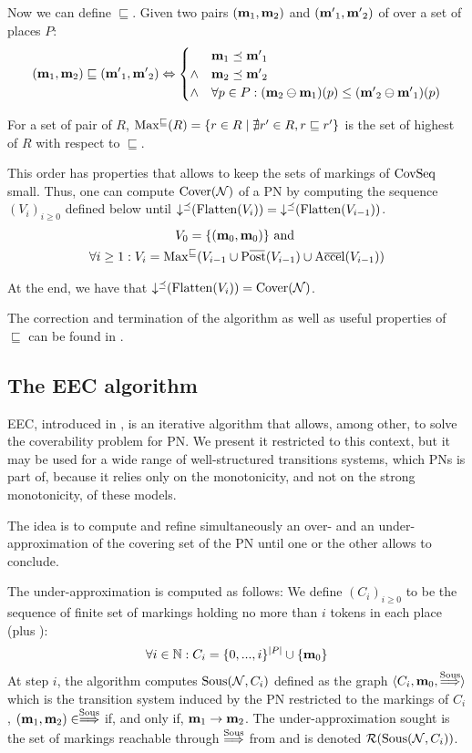 Now we can define $\sqsubseteq$.
Given two pairs $(\mathbf{m}_1, \mathbf{m}_2)$ and $(\mathbf{m'}_1, \mathbf{m'}_2)$ of \omarks over a set of places $P$:
\[
  (\mathbf{m}_1, \mathbf{m}_2) \sqsubseteq (\mathbf{m'}_1, \mathbf{m'}_2) \Leftrightarrow
  \begin{cases}
    & \mathbf{m}_1 \preceq \mathbf{m'}_1 \\
    \wedge & \mathbf{m}_2 \preceq \mathbf{m'}_2 \\
    \wedge & \forall p \in P : (\mathbf{m}_2 \ominus \mathbf{m}_1)(p) \leq (\mathbf{m'}_2 \ominus \mathbf{m'}_1)(p)
  \end{cases}
\]

For a set of pair of \omarks $R$, $\operatorname{Max^\sqsubseteq}(R) = \{ r \in R \mid \nexists r' \in R, r \sqsubseteq r'\}$ is the set of highest \omark of $R$ with respect to $\sqsubseteq$.

This order has properties \citep{Geeraerts07} that allows to keep the sets of markings of $\operatorname{CovSeq}$ small.
Thus, one can compute $\operatorname{Cover}(\mathcal{N})$ of a \ac{PN} \NPTm by computing the sequence $(V_i)_{i \geq 0}$ defined below until $\operatorname{\downarrow^\preceq}(\operatorname{Flatten}(V_i)) = \operatorname{\downarrow^\preceq}(\operatorname{Flatten}(V_{i-1}))$.
\begin{gather*}
  V_0 = \{(\mari, \mari)\} \text{ and } \\
  \forall i \geq 1 : V_i = \Maxs(V_{i-1} \cup \Postb(V_{i-1}) \cup \Accelb(V_{i-1}))
\end{gather*}

At the end, we have that $\operatorname{\downarrow^\preceq}(\operatorname{Flatten}(V_i)) = \operatorname{Cover}(\mathcal{N})$.

The correction and termination of the algorithm as well as useful properties of $\sqsubseteq$ can be found in \cite{Geeraerts07, Ganty09}.

\subsection{The \ac{EEC} algorithm}
\label{sec:eec}

\ac{EEC}, introduced in \cite{Geeraerts07thesis, Geeraerts06}, is an iterative algorithm that allows, among other, to solve the coverability problem for \ac{PN}.
We present it restricted to this context, but it may be used for a wide range of well-structured transitions systems, which \acp{PN} is part of, because it relies only on the monotonicity, and not on the strong monotonicity, of these models.

The idea is to compute and refine simultaneously an over- and an under-approximation of the covering set of the \ac{PN} until one or the other allows to conclude.

The under-approximation is computed as follows:
We define $(C_i)_{i \geq 0}$ to be the sequence of finite set of markings holding no more than $i$ tokens in each place (plus \mari):
\[
  \forall i \in \mathbb{N} : C_i = \{0, ..., i\}^{|P|} \cup \{\mathbf{m}_0\}
\]
At step $i$, the algorithm computes $\operatorname{Sous}(\mathcal{N}, C_i)$ defined as the graph $\langle C_i, \mathbf{m}_0, \stackrel{\operatorname{Sous}}{\Longrightarrow} \rangle$ which is the transition system induced by the \ac{PN} \N restricted to the markings of $C_i$,  $(\mathbf{m}_1, \mathbf{m}_2) \in \stackrel{\operatorname{Sous}}{\Longrightarrow}$ if, and only if, $\mathbf{m}_1 \rightarrow \mathbf{m}_2$.
The under-approximation sought is the set of markings reachable through $\stackrel{\operatorname{Sous}}{\Longrightarrow}$ from \mari and is denoted $\operatorname{\mathcal{R}}(\operatorname{Sous}(\mathcal{N}, C_i))$.

